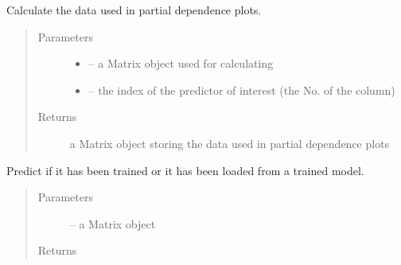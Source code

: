 \documentclass[letterpaper,10pt,english]{sphinxmanual}
\begin{document}
\begin{fulllineitems}
\begin{fulllineitems}
\end{fulllineitems}


\begin{fulllineitems}
\label{\detokenize{index:dbm_py.interface.DBM.pdp}}
Calculate the data used in partial dependence plots.
\begin{quote}\begin{description}
\item[{Parameters}] \leavevmode\begin{itemize}
\item {} 
 -- a Matrix object used for calculating

\item {} 
 -- the index of the predictor of interest (the No. of the column)

\end{itemize}

\item[{Returns}] \leavevmode
a Matrix object storing the data used in partial dependence plots

\end{description}\end{quote}

\end{fulllineitems}


\begin{fulllineitems}
\label{\detokenize{index:dbm_py.interface.DBM.predict}}
Predict if it has been trained or it has been loaded from
a trained model.
\begin{quote}\begin{description}
\item[{Parameters}] \leavevmode
{} -- a Matrix object

\item[{Returns}] \leavevmode


\end{description}\end{quote}

\end{fulllineitems}



\end{fulllineitems}
\end{document}
